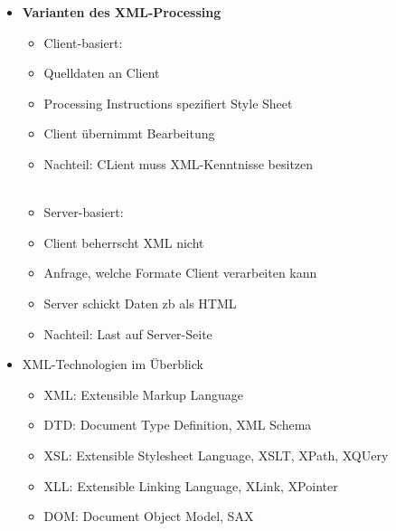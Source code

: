 \begin{itemize}
	\item \textbf{Varianten des XML-Processing}
	\begin{itemize}
		\item Client-basiert:
		\item Quelldaten an Client
		\item Processing Instructions spezifiert Style Sheet
		\item Client übernimmt Bearbeitung
		\item Nachteil: CLient muss XML-Kenntnisse besitzen\\
		\\
		\item Server-basiert:
		\item Client beherrscht XML nicht
		\item Anfrage, welche Formate Client verarbeiten kann
		\item Server schickt Daten zb als HTML
		\item Nachteil: Last auf Server-Seite
	\end{itemize}
	
	\item XML-Technologien im Überblick
	\begin{itemize}
		\item XML: Extensible Markup Language
		\item DTD: Document Type Definition, XML Schema
		\item XSL: Extensible Stylesheet Language, XSLT, XPath, XQUery
		\item XLL: Extensible Linking Language, XLink, XPointer
		\item DOM: Document Object Model, SAX
	\end{itemize}
\end{itemize}


